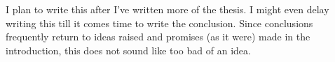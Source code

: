 \label{introduction:introduction}
I plan to write this after I've written more of the thesis. I might even delay writing this till it comes time to write the conclusion. Since conclusions frequently return to ideas raised and promises (as it were) made in the introduction, this does not sound like too bad of an idea.